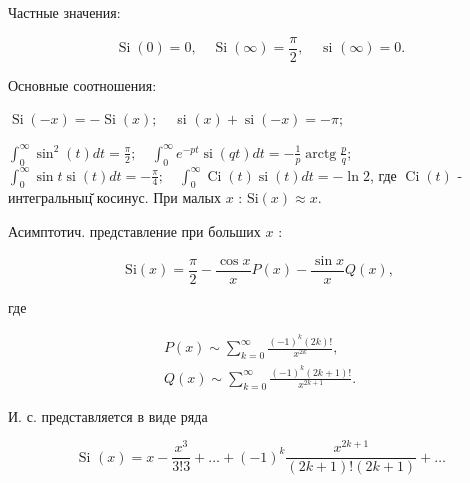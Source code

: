 \documentclass[10pt]{article}
\begin{document}
Частные значения:



\[

\operatorname{Si}(0)=0, \quad \operatorname{Si}(\infty)=\frac{\pi}{2}, \quad \text { si }(\infty)=0 .

\]



Основные соотношения:



$\operatorname{Si}(-x)=-\operatorname{Si}(x) ; \quad$ si $(x)+\operatorname{si}(-x)=-\pi ;$



$\int_{0}^{\infty} \sin ^{2}(t) d t=\frac{\pi}{2} ; \quad \int_{0}^{\infty} e^{-p t} \operatorname{si}(q t) d t=-\frac{1}{p} \operatorname{arctg} \frac{p}{q}$; $\int_{0}^{\infty} \sin t \operatorname{si}(t) d t=-\frac{\pi}{4} ; \quad \int_{0}^{\infty} \operatorname{Ci}(t) \operatorname{si}(t) d t=-\ln 2$, где $\operatorname{Ci}(t)$ - интегральныц̆ косинус. При малых $x$ : $\mathrm{Si}(x) \approx x$.



Асимптотич. представление при больших $x$ :



\[

\mathrm{Si}(x)=\frac{\pi}{2}-\frac{\cos x}{x} P(x)-\frac{\sin x}{x} Q(x),

\]



где



\[

\begin{gathered}

P(x) \sim \sum_{k=0}^{\infty} \frac{(-1)^{k}(2 k) !}{x^{2 k}}, \\

Q(x) \sim \sum_{k=0}^{\infty} \frac{(-1)^{k}(2 k+1) !}{x^{2 k+1}} .

\end{gathered}

\]



И. с. представляется в виде ряда



\[

\text { Si }(x)=x-\frac{x^{3}}{3 ! 3}+\ldots+(-1)^{k} \frac{x^{2 k+1}}{(2 k+1) !(2 k+1)}+\ldots

\]
\end{document}
